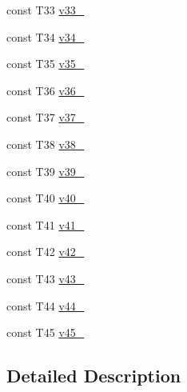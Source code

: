 \begin{DoxyCompactItemize}
\item 
const \-T33 \hyperlink{classtesting_1_1internal_1_1ValueArray45_a7a6cefe370b709c3a7b35b6d5ca8c778}{v33\-\_\-}
\item 
const \-T34 \hyperlink{classtesting_1_1internal_1_1ValueArray45_ab379e4d515d66bc57e05267515fab1d9}{v34\-\_\-}
\item 
const \-T35 \hyperlink{classtesting_1_1internal_1_1ValueArray45_a0a36112ac9b7a13572874977627ed192}{v35\-\_\-}
\item 
const \-T36 \hyperlink{classtesting_1_1internal_1_1ValueArray45_a531a52e3e8de6e982edd23c2547e4c49}{v36\-\_\-}
\item 
const \-T37 \hyperlink{classtesting_1_1internal_1_1ValueArray45_a2c4a91368c3edf933948acb4996a833d}{v37\-\_\-}
\item 
const \-T38 \hyperlink{classtesting_1_1internal_1_1ValueArray45_a364bf323d933a4adac3a9b46952ae1d3}{v38\-\_\-}
\item 
const \-T39 \hyperlink{classtesting_1_1internal_1_1ValueArray45_a0bd84ae118aa56fd251e494d1abc19fb}{v39\-\_\-}
\item 
const \-T40 \hyperlink{classtesting_1_1internal_1_1ValueArray45_ac99de9e6d59182db6141430e54f51e9c}{v40\-\_\-}
\item 
const \-T41 \hyperlink{classtesting_1_1internal_1_1ValueArray45_ad6f7550d60e8d13ade4c5033d07312e9}{v41\-\_\-}
\item 
const \-T42 \hyperlink{classtesting_1_1internal_1_1ValueArray45_a537a167baefbb86e0b3991dfd3d9437a}{v42\-\_\-}
\item 
const \-T43 \hyperlink{classtesting_1_1internal_1_1ValueArray45_a06f403913e68fabe63f09851fbdf196a}{v43\-\_\-}
\item 
const \-T44 \hyperlink{classtesting_1_1internal_1_1ValueArray45_a7fcd42ff659307eb27dce3d92c0dfd27}{v44\-\_\-}
\item 
const \-T45 \hyperlink{classtesting_1_1internal_1_1ValueArray45_afd7b4cf77fb709e9ebc572533d6ec67a}{v45\-\_\-}
\end{DoxyCompactItemize}


\subsection{\-Detailed \-Description}
